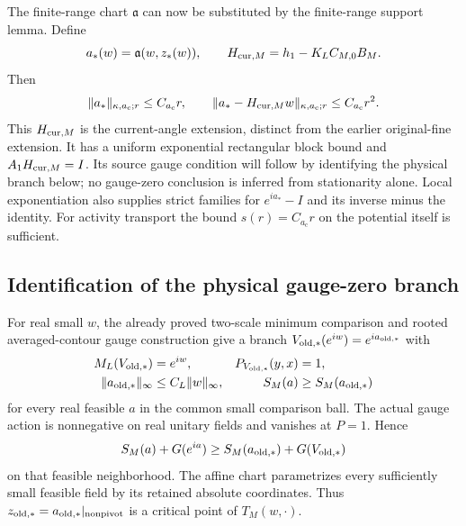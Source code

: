 The finite-range chart $\mathfrak a$ can now be substituted by the
finite-range support lemma. Define
\begin{equation}
 a_*(w)=\mathfrak a(w,z_*(w)),\qquad
 H_{{\rm cur},M}=h_1-K_LC_{M,0}B_M.                          \label{st-current-extension}
\end{equation}
Then
\begin{equation}
 \|a_*\|_{\kappa,a_{\mathrm c};r}\le C_{a_{\mathrm c}}r,
 \qquad
 \|a_*-H_{{\rm cur},M}w\|_{\kappa,a_{\mathrm c};r}
                                      \le C_{a_{\mathrm c}}r^2.          \label{st-current-support}
\end{equation}
This $H_{{\rm cur},M}$ is the current-angle extension, distinct from the
earlier original-fine extension. It has a uniform exponential
rectangular block bound and $A_1H_{{\rm cur},M}=I$. Its source gauge
condition will follow by identifying the physical branch below; no
gauge-zero conclusion is inferred from stationarity alone. Local
exponentiation also supplies strict families for $e^{ia_*}-I$ and its
inverse minus the identity. For activity transport the bound
$s(r)=C_{a_{\mathrm c}}r$ on the potential itself is sufficient.

\subsection{Identification of the physical gauge-zero branch}
\label{st-identification-section}

For real small $w$, the already proved two-scale minimum comparison and
rooted averaged-contour gauge construction give a branch
$V_{{\rm old},*}(e^{iw})=e^{ia_{{\rm old},*}}$ with
\begin{align}
 M_L(V_{{\rm old},*})&=e^{iw},& P_{V_{{\rm old},*}}(y,x)&=1,\notag\\
 \|a_{{\rm old},*}\|_\infty&\le C_L\|w\|_\infty,&
 S_M(a)&\ge S_M(a_{{\rm old},*})                           \label{st-known-minimum}
\end{align}
for every real feasible $a$ in the common small comparison ball. The
actual gauge action is nonnegative on real unitary fields and vanishes
at $P=1$. Hence
\begin{equation}
 S_M(a)+G(e^{ia})\ge S_M(a_{{\rm old},*})+G(V_{{\rm old},*})
                                                               \label{st-action-comparison}
\end{equation}
on that feasible neighborhood. The affine chart parametrizes every
sufficiently small feasible field by its retained absolute coordinates.
Thus $z_{{\rm old},*}=a_{{\rm old},*}|_{\rm nonpivot}$ is a critical
point of $T_M(w,\cdot)$.

